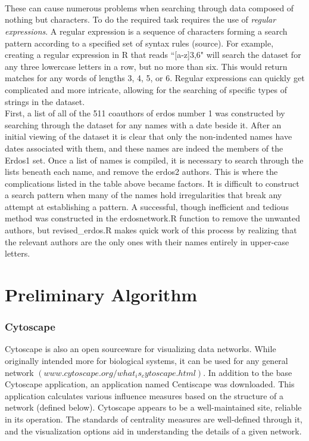 \documentclass[17pt]{extarticle}
\begin{document}
\\
\\
\\
\indent These can cause numerous problems when searching through data composed of nothing but characters. To do the required task requires the use of \textit{regular expressions}. A regular expression is a sequence of characters forming a search pattern according to a specified set of syntax rules (source). For example, creating a regular expression in R that reads ``[a-z]{3,6}" will search the dataset for any three lowercase letters in a row, but no more than six. This would return matches for any words of lengths 3, 4, 5, or 6. Regular expressions can quickly get complicated and more intricate, allowing for the searching of specific types of strings in the dataset. \\
\indent First, a list of all of the 511 coauthors of erdos number 1 was constructed by searching through the dataset for any names with a date beside it. After an initial viewing of the dataset it is clear that only the non-indented names have dates associated with them, and these names are indeed the members of the Erdos1 set. Once a list of names is compiled, it is necessary to search through the lists beneath each name, and remove the erdos2 authors. This is where the complications listed in the table above became factors. It is difficult to construct a search pattern when many of the names hold irregularities that break any attempt at establishing a pattern. A successful, though inefficient and tedious method was constructed in the erdosnetwork.R function to remove the unwanted authors, but revised_erdos.R makes quick work of this process by realizing that the relevant authors are the only ones with their names entirely in upper-case letters. 


\section{Preliminary Algorithm}
      
      \subsubsection{Cytoscape} 
      
      \indent Cytoscape is also an open sourceware for visualizing data networks. While originally intended more for biological systems, it can be used for any general network $(www.cytoscape.org/what_is_cytoscape.html)$. In addition to the base Cytoscape application, an application named Centiscape was downloaded. This application calculates various influence measures based on the structure of a network (defined below). Cytoscape appears to be a well-maintained site, reliable in its operation. The standards of centrality measures are well-defined through it, and the visualization options aid in understanding the details of a given network.
\end{document}
